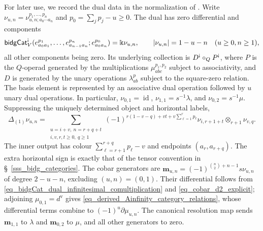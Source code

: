 \documentclass[11pt,letterpaper]{article}
\numberwithin{equation}{section}
\theoremstyle{plain}
\theoremstyle{definition}
\theoremstyle{remark}
\newcommand{\antishriek}{%
	\mathord{\mathchoice
		{\rotatebox[origin=c]{180}{$\displaystyle !$}}
		{\rotatebox[origin=c]{180}{$\textstyle !$}}
		{\rotatebox[origin=c]{180}{$\scriptstyle !$}}
		{\rotatebox[origin=c]{180}{$\scriptscriptstyle !$}}}}
\newcommand{\id}{\operatorname{id}}
\begin{document}
For later use, we record the dual data in the normalization of
\cite[Theorem~2.8 and Corollary~2.9]
{Livernet_Roitzheim_Whitehouse_derived_Ainfinity}.
Write $\nu_{u,n}=\nu_{u,n;a_0\cdots a_n}^{p_1,\ldots,p_n}$ and
$p_0=\sum_jp_j-u\geq0$. The dual has zero differential and components
\[
 \mathsf{bidgCat}_V^{\antishriek}
 (e^{p_1}_{a_0a_1},\ldots,e^{p_n}_{a_{n-1}a_n};e^{p_0}_{a_0a_n})
 =\Bbbk\nu_{u,n},\qquad |\nu_{u,n}|=1-u-n\quad(u\geq0,n\geq1),
\]
all other components being zero. Its underlying collection is
$D^{\antishriek}\circ_{Q}P^{\antishriek}$, where $P$ is the $Q$-operad
generated by the multiplications $\mu^{p_1,p_2}_{abc}$ subject to
associativity, and $D$ is generated by the unary operations
$\lambda^p_{ab}$ subject to the square-zero relation.
The basis element is
represented by an associative dual operation followed by $u$ unary
dual operations. In particular, $\nu_{0,1}=\id$,
$\nu_{1,1}=s^{-1}\lambda$, and $\nu_{0,2}=s^{-1}\mu$.
Suppressing the uniquely determined object and horizontal labels,
\begin{equation}\label{eq_bidgCat_dual_infinitesimal_comultiplication}
 \Delta_{(1)}\nu_{u,n}
 =\sum_{\substack{u=i+v,\ n=r+q+t\\i,v,r,t\geq0,\ q\geq1}}
 (-1)^{r(1-v-q)+vt+v\sum_{\ell=1}^{r}p_\ell}
 \nu_{i,r+1+t}\otimes_{r+1}\nu_{v,q}.
\end{equation}
The inner output has colour $\sum_{\ell=r+1}^{r+q}p_\ell-v$ and
endpoints $(a_r,a_{r+q})$. The extra horizontal sign is exactly that
of the tensor convention in \S~\ref{sss_bidg_categories}.
The cobar generators are
$\mathbf m_{u,n}=(-1)^{\binom n2+n-1}s\nu_{u,n}$ of degree $2-u-n$,
excluding $(u,n)=(0,1)$. Their differential follows from
\eqref{eq_bidgCat_dual_infinitesimal_comultiplication} and
\eqref{eq_cobar_d2_explicit}; adjoining $\mu_{0,1}=d^{\mathrm v}$ gives
\eqref{eq_derived_Ainfinity_category_relations}, whose differential
terms combine to $(-1)^u\partial\mu_{u,n}$. The canonical resolution map sends
$\mathbf m_{1,1}$ to $\lambda$ and $\mathbf m_{0,2}$ to $\mu$, and
all other generators to zero.
\end{document}
